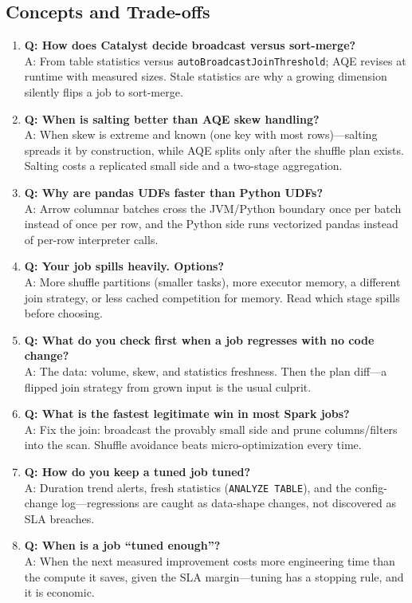 \subsection{Concepts and Trade-offs}
\begin{enumerate}
    \item \textbf{Q: How does Catalyst decide broadcast versus sort-merge?}\\
    A: From table statistics versus \texttt{autoBroadcastJoinThreshold}; AQE revises at runtime with measured sizes. Stale statistics are why a growing dimension silently flips a job to sort-merge.
    \item \textbf{Q: When is salting better than AQE skew handling?}\\
    A: When skew is extreme and known (one key with most rows)---salting spreads it by construction, while AQE splits only after the shuffle plan exists. Salting costs a replicated small side and a two-stage aggregation.
    \item \textbf{Q: Why are pandas UDFs faster than Python UDFs?}\\
    A: Arrow columnar batches cross the JVM/Python boundary once per batch instead of once per row, and the Python side runs vectorized pandas instead of per-row interpreter calls.
    \item \textbf{Q: Your job spills heavily. Options?}\\
    A: More shuffle partitions (smaller tasks), more executor memory, a different join strategy, or less cached competition for memory. Read which stage spills before choosing.
    \item \textbf{Q: What do you check first when a job regresses with no code change?}\\
    A: The data: volume, skew, and statistics freshness. Then the plan diff---a flipped join strategy from grown input is the usual culprit.
    \item \textbf{Q: What is the fastest legitimate win in most Spark jobs?}\\
    A: Fix the join: broadcast the provably small side and prune columns/filters into the scan. Shuffle avoidance beats micro-optimization every time.
    \item \textbf{Q: How do you keep a tuned job tuned?}\\
    A: Duration trend alerts, fresh statistics (\texttt{ANALYZE TABLE}), and the config-change log---regressions are caught as data-shape changes, not discovered as SLA breaches.
    \item \textbf{Q: When is a job ``tuned enough''?}\\
    A: When the next measured improvement costs more engineering time than the compute it saves, given the SLA margin---tuning has a stopping rule, and it is economic.
\end{enumerate}

